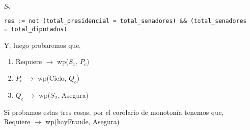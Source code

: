 \documentclass[10pt,a4paper]{article}
\begin{document}
\vspace{0.3cm}

$S_2$


	\begin{lstlisting}[caption={},label=code:for]
res := not (total_presidencial = total_senadores) && (total_senadores = total_diputados)
	\end{lstlisting}

\vspace{0.3cm}

Y, luego probaremos que,


\begin{enumerate}\setlength{\itemindent}{0.5cm}
		\item Requiere $\rightarrow$ wp($S_1$, $P_c$)
		\item $P_c$ $\rightarrow$ wp(Ciclo, $Q_c$)
		\item $Q_c$ $\rightarrow$ wp($S_2$, Asegura)
\end{enumerate}

Si probamos estas tres cosas, por el corolario de monotonía tenemos que, \vspace{0.2cm} \\
\indent \qquad \quad Requiere $\rightarrow$ wp(hayFraude, Asegura)

\vspace{0.3cm}
\end{document}
